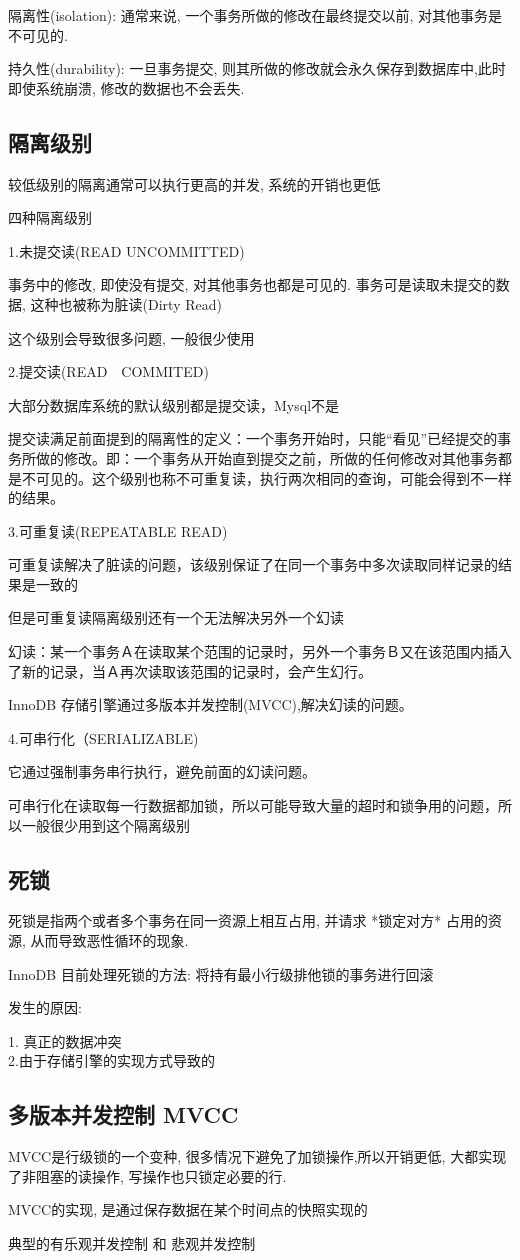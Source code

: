 \documentclass[UTF8]{ctexart}
\begin{document}
隔离性(isolation): 通常来说, 一个事务所做的修改在最终提交以前, 对其他事务是不可见的.

持久性(durability): 一旦事务提交, 则其所做的修改就会永久保存到数据库中,此时即使系统崩溃, 修改的数据也不会丢失.

\subsection{隔离级别}
较低级别的隔离通常可以执行更高的并发, 系统的开销也更低

四种隔离级别

1.未提交读(READ UNCOMMITTED) 

事务中的修改, 即使没有提交, 对其他事务也都是可见的. 事务可是读取未提交的数据, 这种也被称为脏读(Dirty Read)

这个级别会导致很多问题, 一般很少使用

2.提交读(READ　COMMITED)

大部分数据库系统的默认级别都是提交读，Mysql不是

提交读满足前面提到的隔离性的定义：一个事务开始时，只能“看见”已经提交的事务所做的修改。即：一个事务从开始直到提交之前，所做的任何修改对其他事务都是不可见的。这个级别也称不可重复读，执行两次相同的查询，可能会得到不一样的结果。

3.可重复读(REPEATABLE READ)

可重复读解决了脏读的问题，该级别保证了在同一个事务中多次读取同样记录的结果是一致的

但是可重复读隔离级别还有一个无法解决另外一个幻读

幻读：某一个事务Ａ在读取某个范围的记录时，另外一个事务Ｂ又在该范围内插入了新的记录，当Ａ再次读取该范围的记录时，会产生幻行。

InnoDB 存储引擎通过多版本并发控制(MVCC),解决幻读的问题。


4.可串行化（SERIALIZABLE)

它通过强制事务串行执行，避免前面的幻读问题。

可串行化在读取每一行数据都加锁，所以可能导致大量的超时和锁争用的问题，所以一般很少用到这个隔离级别

\subsection{死锁}

死锁是指两个或者多个事务在同一资源上相互占用, 并请求 *锁定对方* 占用的资源, 从而导致恶性循环的现象.

InnoDB 目前处理死锁的方法: 将持有最小行级排他锁的事务进行回滚

发生的原因: 

1. 真正的数据冲突 \\2.由于存储引擎的实现方式导致的

\subsection{多版本并发控制 MVCC}
MVCC是行级锁的一个变种, 很多情况下避免了加锁操作,所以开销更低, 大都实现了非阻塞的读操作, 写操作也只锁定必要的行.

MVCC的实现, 是通过保存数据在某个时间点的快照实现的

典型的有乐观并发控制 和 悲观并发控制
\end{document}
